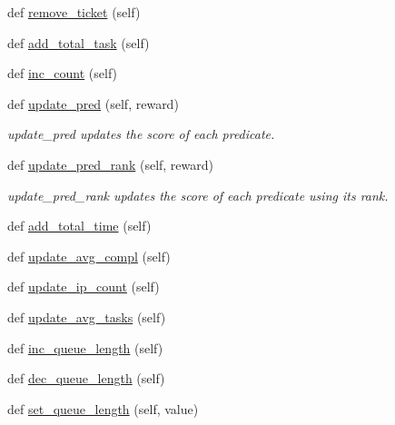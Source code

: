 \begin{DoxyCompactItemize}
\item 
def \hyperlink{classdynamicfilterapp_1_1models_1_1_predicate_aa50b82ab39c996d4b89694655057ab8e}{remove\+\_\+ticket} (self)
\item 
def \hyperlink{classdynamicfilterapp_1_1models_1_1_predicate_abc989a62ab5e42f27e19abb3f0744d0d}{add\+\_\+total\+\_\+task} (self)
\item 
def \hyperlink{classdynamicfilterapp_1_1models_1_1_predicate_abe39cd365c5c5fe81f91f66e1a331599}{inc\+\_\+count} (self)
\item 
def \hyperlink{classdynamicfilterapp_1_1models_1_1_predicate_a10d89924e071640aee4eedd86662e505}{update\+\_\+pred} (self, reward)
\begin{DoxyCompactList}\small\item\em update\+\_\+pred updates the score of each predicate. \end{DoxyCompactList}\item 
def \hyperlink{classdynamicfilterapp_1_1models_1_1_predicate_a8945ec4943839cc7dc37954ae33e2397}{update\+\_\+pred\+\_\+rank} (self, reward)
\begin{DoxyCompactList}\small\item\em update\+\_\+pred\+\_\+rank updates the score of each predicate using its rank. \end{DoxyCompactList}\item 
def \hyperlink{classdynamicfilterapp_1_1models_1_1_predicate_a5d9324dd67dcaae3edb112d23c33a9d8}{add\+\_\+total\+\_\+time} (self)
\item 
def \hyperlink{classdynamicfilterapp_1_1models_1_1_predicate_a5d8c939a3e8f1815ac4768caea92ea9e}{update\+\_\+avg\+\_\+compl} (self)
\item 
def \hyperlink{classdynamicfilterapp_1_1models_1_1_predicate_af28772c782daf9e16362c89252e4c75c}{update\+\_\+ip\+\_\+count} (self)
\item 
def \hyperlink{classdynamicfilterapp_1_1models_1_1_predicate_a46ea5633155540e0474830a73ece68de}{update\+\_\+avg\+\_\+tasks} (self)
\item 
def \hyperlink{classdynamicfilterapp_1_1models_1_1_predicate_a6e8c8ca5961ded4fefad793206ed2612}{inc\+\_\+queue\+\_\+length} (self)
\item 
def \hyperlink{classdynamicfilterapp_1_1models_1_1_predicate_adf2c6e37d925945ace447e024b31b87e}{dec\+\_\+queue\+\_\+length} (self)
\item 
def \hyperlink{classdynamicfilterapp_1_1models_1_1_predicate_adb36a52d2acdedc33d742d219e0acf7e}{set\+\_\+queue\+\_\+length} (self, value)

\end{DoxyCompactItemize}
